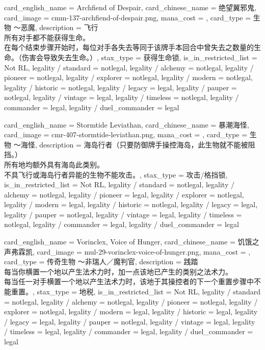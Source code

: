 \documentclass[lang = cn, color = black, 10pt]{AllThatStax}
\begin{document}
\card
{
	card_english_name = {Archfiend of Despair},
	card_chinese_name = {绝望翼邪鬼},
	card_image = cmm-137-archfiend-of-despair.png,
	mana_cost = ,
	card_type = 生物 ～恶魔,
	description = {飞行\\
		所有对手都不能获得生命。\\
		在每个结束步骤开始时，每位对手各失去等同于该牌手本回合中曾失去之数量的生命。（伤害会导致失去生命。）},
	stax_type = 获得生命锁,
	is_in_restricted_list = Not RL,
	legality / standard = notlegal,
	legality / alchemy = notlegal,
	legality / pioneer = notlegal,
	legality / explorer = notlegal,
	legality / modern = notlegal,
	legality / historic = notlegal,
	legality / legacy = legal,
	legality / pauper = notlegal,
	legality / vintage = legal,
	legality / timeless = notlegal,
	legality / commander = legal,
	legality / duel_commander = legal
}

\card
{
	card_english_name = {Stormtide Leviathan},
	card_chinese_name = {暴潮海怪},
	card_image = cmr-407-stormtide-leviathan.png,
	mana_cost = ,
	card_type = 生物 ～海怪,
	description = {海岛行者（只要防御牌手操控海岛，此生物就不能被阻挡。）\\
		所有地均额外具有海岛此类别。\\
		不具飞行或海岛行者异能的生物不能攻击。},
	stax_type = 攻击/格挡锁,
	is_in_restricted_list = Not RL,
	legality / standard = notlegal,
	legality / alchemy = notlegal,
	legality / pioneer = legal,
	legality / explorer = notlegal,
	legality / modern = legal,
	legality / historic = notlegal,
	legality / legacy = legal,
	legality / pauper = notlegal,
	legality / vintage = legal,
	legality / timeless = notlegal,
	legality / commander = legal,
	legality / duel_commander = legal
}

\card
{
	card_english_name = {Vorinclex, Voice of Hunger},
	card_chinese_name = {饥饿之声弗霖凯},
	card_image = mul-29-vorinclex-voice-of-hunger.png,
	mana_cost = ,
	card_type = 传奇生物 ～非瑞人／魔判官,
	description = {践踏\\
		每当你横置一个地以产生法术力时，加一点该地已产生的类别之法术力。\\
		每当任一对手横置一个地以产生法术力时，该地于其操控者的下一个重置步骤中不能重置。},
	stax_type = 地税,
	is_in_restricted_list = Not RL,
	legality / standard = notlegal,
	legality / alchemy = notlegal,
	legality / pioneer = notlegal,
	legality / explorer = notlegal,
	legality / modern = legal,
	legality / historic = legal,
	legality / legacy = legal,
	legality / pauper = notlegal,
	legality / vintage = legal,
	legality / timeless = legal,
	legality / commander = legal,
	legality / duel_commander = legal
}
\end{document}
